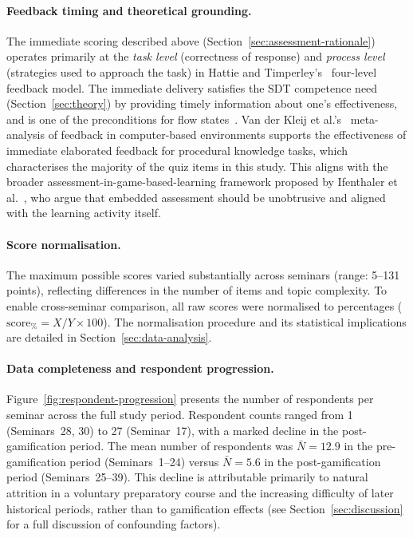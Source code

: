 \paragraph{Feedback timing and theoretical grounding.}
The immediate scoring described above (Section~\ref{sec:assessment-rationale}) operates primarily at the \emph{task level} (correctness of response) and \emph{process level} (strategies used to approach the task) in Hattie and Timperley's~\cite{HattieTimperley2007} four-level feedback model. The immediate delivery satisfies the SDT competence need~\cite{RyanDeci2000} (Section~\ref{sec:theory}) by providing timely information about one's effectiveness, and is one of the preconditions for flow states~\cite{Csikszentmihalyi1990}. Van der Kleij et al.'s~\cite{VanDerKleij2015} meta-analysis of feedback in computer-based environments supports the effectiveness of immediate elaborated feedback for procedural knowledge tasks, which characterises the majority of the quiz items in this study. This aligns with the broader assessment-in-game-based-learning framework proposed by Ifenthaler et al.~\cite{IfenthalerEseryel2012}, who argue that embedded assessment should be unobtrusive and aligned with the learning activity itself.

\paragraph{Score normalisation.}
The maximum possible scores varied substantially across seminars (range: 5--131 points), reflecting differences in the number of items and topic complexity. To enable cross-seminar comparison, all raw scores were normalised to percentages ($\text{score}_\% = X / Y \times 100$). The normalisation procedure and its statistical implications are detailed in Section~\ref{sec:data-analysis}.

\paragraph{Data completeness and respondent progression.}
Figure~\ref{fig:respondent-progression} presents the number of respondents per seminar across the full study period. Respondent counts ranged from 1 (Seminars~28, 30) to 27 (Seminar~17), with a marked decline in the post-gamification period. The mean number of respondents was $\bar{\textit{N}}\!=\!12.9$ in the pre-gamification period (Seminars~1--24) versus $\bar{\textit{N}}\!=\!5.6$ in the post-gamification period (Seminars~25--39). This decline is attributable primarily to natural attrition in a voluntary preparatory course and the increasing difficulty of later historical periods, rather than to gamification effects (see Section~\ref{sec:discussion} for a full discussion of confounding factors).


